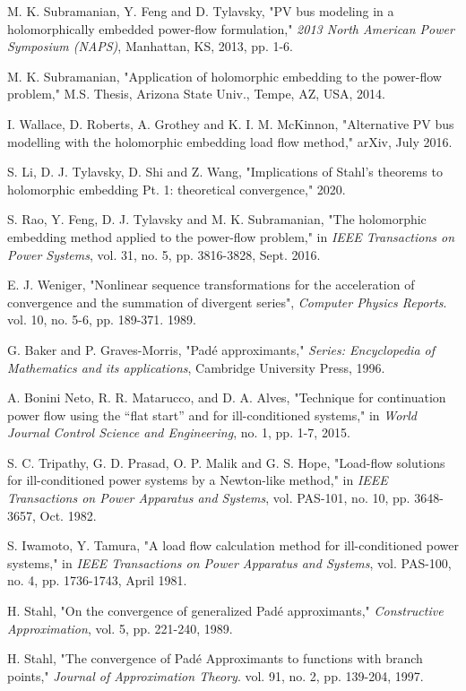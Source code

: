 \documentclass[conference]{IEEEtran}
\begin{document}
\begin{thebibliography}{22}
M. K. Subramanian, Y. Feng and D. Tylavsky, "PV bus modeling in a holomorphically embedded power-flow formulation," \emph{2013 North American Power Symposium (NAPS)}, Manhattan, KS, 2013, pp. 1-6.

M. K. Subramanian, "Application of holomorphic embedding to the power-flow problem," M.S. Thesis, Arizona State Univ., Tempe, AZ, USA, 2014.

I. Wallace, D. Roberts, A. Grothey and K. I. M. McKinnon, "Alternative PV bus modelling with the holomorphic embedding load flow method," arXiv, July 2016.

S. Li, D. J. Tylavsky, D. Shi and Z. Wang, "Implications of Stahl's theorems to holomorphic embedding Pt. 1: theoretical convergence," 2020.

S. Rao, Y. Feng, D. J. Tylavsky and M. K. Subramanian, "The holomorphic embedding method applied to the power-flow problem," in \emph{IEEE Transactions on Power Systems}, vol. 31, no. 5, pp. 3816-3828, Sept. 2016.

E. J. Weniger, "Nonlinear sequence transformations for the acceleration of convergence and the summation of divergent series", \emph{Computer Physics Reports}. vol. 10, no. 5-6, pp. 189-371. 1989.

G. Baker and P. Graves-Morris, "Padé approximants," \emph{Series: Encyclopedia of Mathematics and its applications}, Cambridge University Press, 1996.

A. Bonini Neto, R. R. Matarucco, and D. A. Alves, "Technique for continuation power flow using the “flat start” and for ill-conditioned systems," in \emph{World Journal Control Science and Engineering}, no. 1, pp. 1-7, 2015.

S. C. Tripathy, G. D. Prasad, O. P. Malik and G. S. Hope, "Load-flow solutions for ill-conditioned power systems by a Newton-like method," in \emph{IEEE Transactions on Power Apparatus and Systems}, vol. PAS-101, no. 10, pp. 3648-3657, Oct. 1982.

S. Iwamoto, Y. Tamura, "A load flow calculation method for ill-conditioned power systems," in \emph{IEEE Transactions on Power Apparatus and Systems}, vol. PAS-100, no. 4, pp. 1736-1743, April 1981.

H. Stahl, "On the convergence of generalized Padé approximants," \emph{Constructive Approximation}, vol. 5, pp. 221-240, 1989.

H. Stahl, "The convergence of Padé Approximants to functions with branch points," \emph{Journal of Approximation Theory}. vol. 91, no. 2, pp. 139-204, 1997.




\end{thebibliography}




\end{document}
